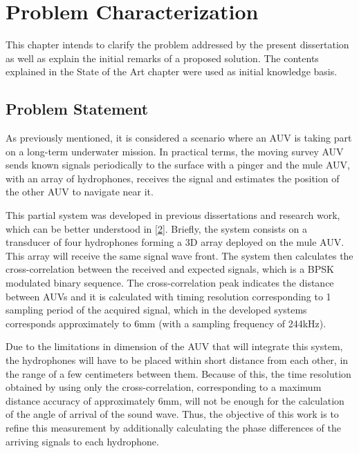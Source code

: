 \chapter{Problem Characterization}\label{chap:chap3}

This chapter intends to clarify the problem addressed by the present dissertation as well as explain the initial remarks of a proposed solution. The contents explained in the State of the Art chapter were used as initial knowledge basis.

\section{Problem Statement}

As previously mentioned, it is considered a scenario where an AUV is taking part on a long-term underwater mission. In practical terms, the moving survey AUV sends known signals periodically to the surface with a pinger and the mule AUV, with an array of hydrophones, receives the signal and estimates the position of the other AUV to navigate near it.



This partial system was developed in previous dissertations and research work, which can be better understood in [\hyperref[eq:spd-sound]{2}]. Briefly, the system consists on a transducer of four hydrophones forming a 3D array deployed on the mule AUV. This array will receive the same signal wave front. The system then calculates the cross-correlation between the received and expected signals, which is a BPSK modulated binary sequence. The cross-correlation peak indicates the distance between AUVs and it is calculated with timing resolution corresponding to 1 sampling period of the acquired signal, which in the developed systems corresponds approximately to 6mm (with a sampling frequency of 244kHz).
 

Due to the limitations in dimension of the AUV that will integrate this system, the hydrophones will have to be placed within short distance from each other, in the range of a few centimeters between them. Because of this, the time resolution obtained by using only the cross-correlation, corresponding to a maximum distance accuracy of approximately 6mm, will not be enough for the calculation of the angle of arrival of the sound wave. Thus, the objective of this work is to refine this measurement by additionally calculating the phase differences of the arriving signals to each hydrophone. 

